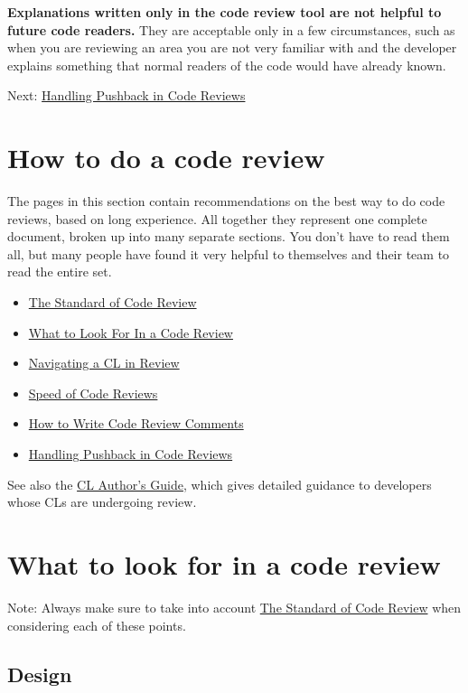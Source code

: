 \documentclass[
]{article}
\providecommand{\tightlist}{%
  \setlength{\itemsep}{0pt}\setlength{\parskip}{0pt}}
\begin{document}
\textbf{Explanations written only in the code review tool are not
helpful to future code readers.} They are acceptable only in a few
circumstances, such as when you are reviewing an area you are not very
familiar with and the developer explains something that normal readers
of the code would have already known.

Next: \href{pushback.md}{Handling Pushback in Code Reviews}

\section{How to do a code review}\label{how-to-do-a-code-review}

The pages in this section contain recommendations on the best way to do
code reviews, based on long experience. All together they represent one
complete document, broken up into many separate sections. You don't have
to read them all, but many people have found it very helpful to
themselves and their team to read the entire set.

\begin{itemize}
\tightlist
\item
  \href{standard.md}{The Standard of Code Review}
\item
  \href{looking-for.md}{What to Look For In a Code Review}
\item
  \href{navigate.md}{Navigating a CL in Review}
\item
  \href{speed.md}{Speed of Code Reviews}
\item
  \href{comments.md}{How to Write Code Review Comments}
\item
  \href{pushback.md}{Handling Pushback in Code Reviews}
\end{itemize}

See also the \href{../developer/index.md}{CL Author's Guide}, which
gives detailed guidance to developers whose CLs are undergoing review.

\section{What to look for in a code
review}\label{what-to-look-for-in-a-code-review}

Note: Always make sure to take into account \href{standard.md}{The
Standard of Code Review} when considering each of these points.

\subsection{Design}\label{design}
\end{document}
